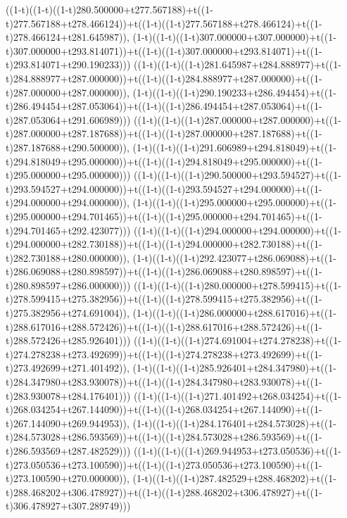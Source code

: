 ((1-t)((1-t)((1-t)280.500000+t277.567188)+t((1-t)277.567188+t278.466124))+t((1-t)((1-t)277.567188+t278.466124)+t((1-t)278.466124+t281.645987)),                                     (1-t)((1-t)((1-t)307.000000+t307.000000)+t((1-t)307.000000+t293.814071))+t((1-t)((1-t)307.000000+t293.814071)+t((1-t)293.814071+t290.190233)))
((1-t)((1-t)((1-t)281.645987+t284.888977)+t((1-t)284.888977+t287.000000))+t((1-t)((1-t)284.888977+t287.000000)+t((1-t)287.000000+t287.000000)),                                     (1-t)((1-t)((1-t)290.190233+t286.494454)+t((1-t)286.494454+t287.053064))+t((1-t)((1-t)286.494454+t287.053064)+t((1-t)287.053064+t291.606989)))
((1-t)((1-t)((1-t)287.000000+t287.000000)+t((1-t)287.000000+t287.187688))+t((1-t)((1-t)287.000000+t287.187688)+t((1-t)287.187688+t290.500000)),                                     (1-t)((1-t)((1-t)291.606989+t294.818049)+t((1-t)294.818049+t295.000000))+t((1-t)((1-t)294.818049+t295.000000)+t((1-t)295.000000+t295.000000)))
((1-t)((1-t)((1-t)290.500000+t293.594527)+t((1-t)293.594527+t294.000000))+t((1-t)((1-t)293.594527+t294.000000)+t((1-t)294.000000+t294.000000)),                                     (1-t)((1-t)((1-t)295.000000+t295.000000)+t((1-t)295.000000+t294.701465))+t((1-t)((1-t)295.000000+t294.701465)+t((1-t)294.701465+t292.423077)))
((1-t)((1-t)((1-t)294.000000+t294.000000)+t((1-t)294.000000+t282.730188))+t((1-t)((1-t)294.000000+t282.730188)+t((1-t)282.730188+t280.000000)),                                     (1-t)((1-t)((1-t)292.423077+t286.069088)+t((1-t)286.069088+t280.898597))+t((1-t)((1-t)286.069088+t280.898597)+t((1-t)280.898597+t286.000000)))
((1-t)((1-t)((1-t)280.000000+t278.599415)+t((1-t)278.599415+t275.382956))+t((1-t)((1-t)278.599415+t275.382956)+t((1-t)275.382956+t274.691004)),                                     (1-t)((1-t)((1-t)286.000000+t288.617016)+t((1-t)288.617016+t288.572426))+t((1-t)((1-t)288.617016+t288.572426)+t((1-t)288.572426+t285.926401)))
((1-t)((1-t)((1-t)274.691004+t274.278238)+t((1-t)274.278238+t273.492699))+t((1-t)((1-t)274.278238+t273.492699)+t((1-t)273.492699+t271.401492)),                                     (1-t)((1-t)((1-t)285.926401+t284.347980)+t((1-t)284.347980+t283.930078))+t((1-t)((1-t)284.347980+t283.930078)+t((1-t)283.930078+t284.176401)))
((1-t)((1-t)((1-t)271.401492+t268.034254)+t((1-t)268.034254+t267.144090))+t((1-t)((1-t)268.034254+t267.144090)+t((1-t)267.144090+t269.944953)),                                     (1-t)((1-t)((1-t)284.176401+t284.573028)+t((1-t)284.573028+t286.593569))+t((1-t)((1-t)284.573028+t286.593569)+t((1-t)286.593569+t287.482529)))
((1-t)((1-t)((1-t)269.944953+t273.050536)+t((1-t)273.050536+t273.100590))+t((1-t)((1-t)273.050536+t273.100590)+t((1-t)273.100590+t270.000000)),                                     (1-t)((1-t)((1-t)287.482529+t288.468202)+t((1-t)288.468202+t306.478927))+t((1-t)((1-t)288.468202+t306.478927)+t((1-t)306.478927+t307.289749)))
